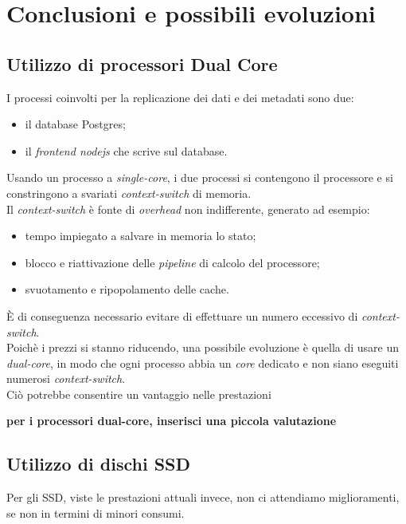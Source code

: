 \chapter{Conclusioni e possibili evoluzioni}

\section{Utilizzo di processori Dual Core}
I processi coinvolti per la replicazione dei dati e dei metadati sono due: 
\begin{itemize}
\item 
il database Postgres;
\item
il \textit{frontend nodejs} che scrive sul database.\\
\end{itemize}

Usando un processo a \textit{single-core}, i due processi si contengono il processore e si constringono a svariati \textit{context-switch} di memoria.\\
Il \textit{context-switch} \`{e} fonte di \textit{overhead} non indifferente, generato ad esempio:
\begin{itemize}
\item 
tempo impiegato a salvare in memoria lo stato;
\item
blocco e riattivazione delle \textit{pipeline} di calcolo del processore;
\item 
svuotamento e ripopolamento delle cache.
\end{itemize}

\`{E} di conseguenza necessario evitare di effettuare un numero eccessivo di \textit{context-switch}.\\

Poich\`{e} i prezzi si stanno riducendo, una possibile evoluzione \`{e} quella di usare un \textit{dual-core}, in modo che ogni processo abbia un \textit{core} dedicato e non siano eseguiti numerosi \textit{context-switch}.\\
Ci\`{o} potrebbe consentire un vantaggio nelle prestazioni

\textbf{per i processori dual-core, inserisci una piccola valutazione
}

\section{Utilizzo di dischi SSD}
Per gli SSD, viste le prestazioni attuali invece, non ci attendiamo miglioramenti, se non in termini di minori consumi.
